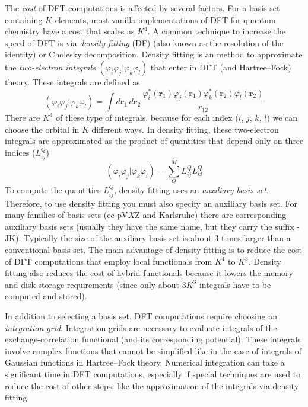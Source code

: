 \documentclass[../Main/notes.tex]{subfiles}
\begin{document}
The \emph{cost} of DFT computations is affected by several factors.
For a basis set containing $K$ elements, most vanilla implementations of DFT for quantum chemistry have a cost that scales as $K^4$.
A common technique to increase the speed of DFT is via \emph{density fitting} (DF) (also known as the resolution of the identity) or Cholesky decomposition.
Density fitting is an method to approximate the \emph{two-electron integrals} $(\varphi_i \varphi_j | \varphi_k \varphi_l)$ that enter in DFT (and Hartree--Fock) theory.
These integrals are defined as
\begin{equation}
(\varphi_i \varphi_j | \varphi_k \varphi_l) = 
\int d\mathbf{r}_1 \, d\mathbf{r}_2 \, \frac{\varphi^*_i(\mathbf{r}_1) \varphi_j(\mathbf{r}_1) \varphi^*_k(\mathbf{r}_2) \varphi_l(\mathbf{r}_2)}{r_{12}}
\end{equation}
There are $K^4$ of these type of integrals, because for each index ($i$, $j$, $k$, $l$) we can choose the orbital in $K$ different ways.
In density fitting, these two-electron integrals are approximated as the product of quantities that depend only on three indices ($L_{ij}^{Q}$)
\begin{equation}
(\varphi_i \varphi_j | \varphi_k \varphi_l) = \sum_Q^M L_{ij}^{Q} L_{kl}^{Q}
\end{equation}
To compute the quantities $L_{ij}^{Q}$, density fitting uses an \emph{auxiliary basis set}.
Therefore, to use density fitting you must also specify an auxiliary basis set.
For many families of basis sets (cc-pV$X$Z and Karlsruhe) there are corresponding auxiliary basis sets (usually they have the same name, but they carry the suffix -JK).
Typically the size of the auxiliary basis set is about 3 times larger than a conventional basis set.
The main advantage of density fitting is to reduce the cost of DFT computations that employ local functionals from $K^4$ to $K^3$.
Density fitting also reduces the cost of  hybrid functionals because it lowers the memory and disk storage requirements (since only about 3$K^3$ integrals have to be computed and stored).

In addition to selecting a basis set, DFT computations require choosing an \emph{integration grid}.
Integration grids are necessary to evaluate integrals of the exchange-correlation functional (and its corresponding potential).
These integrals involve complex functions that cannot be simplified like in the case of integrals of Gaussian functions in Hartree--Fock theory.
Numerical integration can take a significant time in DFT computations, especially if special techniques are used to reduce the cost of other steps, like the approximation of the integrals via density fitting.
\end{document}
